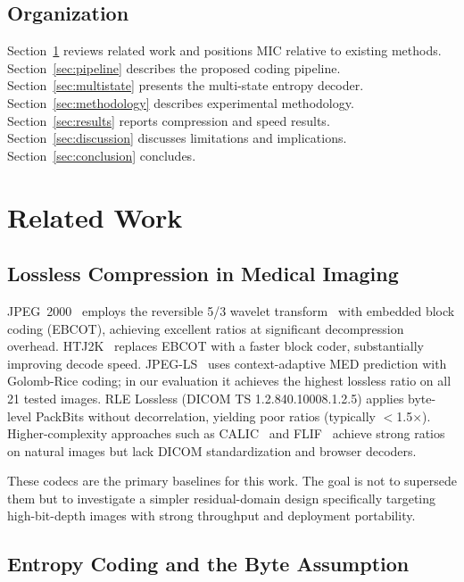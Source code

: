\documentclass[journal]{IEEEtran}
\begin{document}
\subsection{Organization}

Section~\ref{sec:related} reviews related work and positions MIC relative to
existing methods. Section~\ref{sec:pipeline} describes the proposed coding
pipeline. Section~\ref{sec:multistate} presents the multi-state entropy decoder.
Section~\ref{sec:methodology} describes experimental methodology.
Section~\ref{sec:results} reports compression and speed results.
Section~\ref{sec:discussion} discusses limitations and implications.
Section~\ref{sec:conclusion} concludes.

\section{Related Work}
\label{sec:related}

\subsection{Lossless Compression in Medical Imaging}

JPEG~2000~\cite{taubman2002} employs the reversible 5/3 wavelet
transform~\cite{legall1988,calderbank1998} with embedded block coding (EBCOT),
achieving excellent ratios at significant decompression overhead. HTJ2K~\cite{htj2k2019,taubman2022}
replaces EBCOT with a faster block coder, substantially improving decode
speed. JPEG-LS~\cite{loco1,jpegls2} uses context-adaptive MED prediction with
Golomb-Rice coding; in our evaluation it achieves the highest lossless ratio on
all 21 tested images. RLE Lossless (DICOM TS 1.2.840.10008.1.2.5) applies
byte-level PackBits without decorrelation, yielding poor ratios
(typically $<$1.5$\times$). Higher-complexity approaches such as
CALIC~\cite{wu1997} and FLIF~\cite{sneyers2016} achieve strong ratios on
natural images but lack DICOM standardization and browser decoders.

These codecs are the primary baselines for this work. The goal is not to
supersede them but to investigate a simpler residual-domain design specifically
targeting high-bit-depth images with strong throughput and deployment
portability.

\subsection{Entropy Coding and the Byte Assumption}
\end{document}
